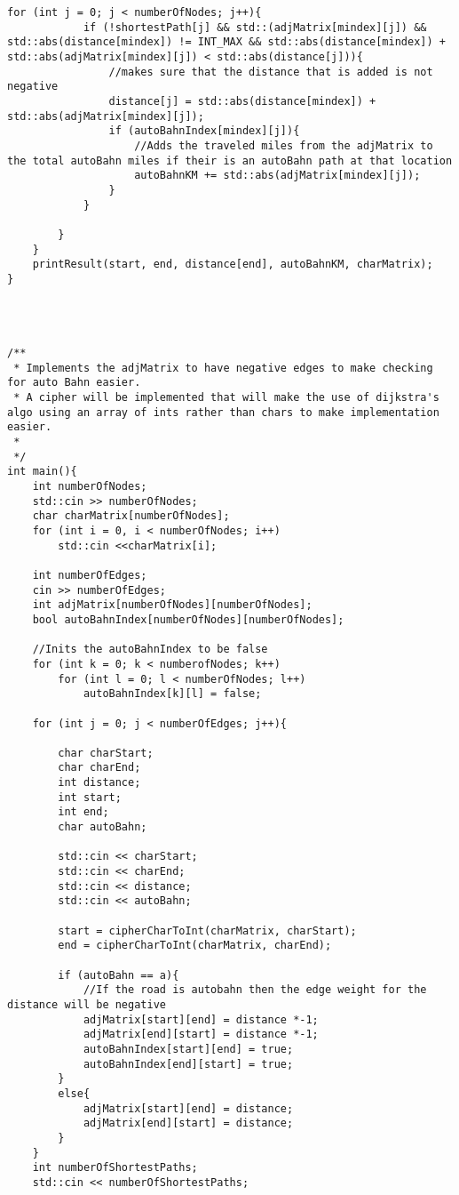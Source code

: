 \documentclass[11pt]{article}
\begin{document}
\begin {lstlisting}[frame=single]
        for (int j = 0; j < numberOfNodes; j++){
            if (!shortestPath[j] && std::(adjMatrix[mindex][j]) && std::abs(distance[mindex]) != INT_MAX && std::abs(distance[mindex]) + std::abs(adjMatrix[mindex][j]) < std::abs(distance[j])){
                //makes sure that the distance that is added is not negative 
                distance[j] = std::abs(distance[mindex]) + std::abs(adjMatrix[mindex][j]); 
                if (autoBahnIndex[mindex][j]){
                    //Adds the traveled miles from the adjMatrix to the total autoBahn miles if their is an autoBahn path at that location
                    autoBahnKM += std::abs(adjMatrix[mindex][j]);
                }
            }
            
        }
    }
    printResult(start, end, distance[end], autoBahnKM, charMatrix); 
}




/**
 * Implements the adjMatrix to have negative edges to make checking for auto Bahn easier.
 * A cipher will be implemented that will make the use of dijkstra's algo using an array of ints rather than chars to make implementation easier.
 * 
 */
int main(){
    int numberOfNodes;
    std::cin >> numberOfNodes;
    char charMatrix[numberOfNodes];
    for (int i = 0, i < numberOfNodes; i++)
        std::cin <<charMatrix[i];
    
    int numberOfEdges;
    cin >> numberOfEdges;
    int adjMatrix[numberOfNodes][numberOfNodes];
    bool autoBahnIndex[numberOfNodes][numberOfNodes];
    
    //Inits the autoBahnIndex to be false 
    for (int k = 0; k < numberofNodes; k++)
        for (int l = 0; l < numberOfNodes; l++)
            autoBahnIndex[k][l] = false;

    for (int j = 0; j < numberOfEdges; j++){

        char charStart;
        char charEnd;
        int distance;
        int start;
        int end;
        char autoBahn;

        std::cin << charStart;
        std::cin << charEnd;
        std::cin << distance;
        std::cin << autoBahn;
        
        start = cipherCharToInt(charMatrix, charStart);
        end = cipherCharToInt(charMatrix, charEnd);
               
        if (autoBahn == a){
            //If the road is autobahn then the edge weight for the distance will be negative 
            adjMatrix[start][end] = distance *-1;
            adjMatrix[end][start] = distance *-1;
            autoBahnIndex[start][end] = true;
            autoBahnIndex[end][start] = true;
        }
        else{
            adjMatrix[start][end] = distance;
            adjMatrix[end][start] = distance;
        }
    }
    int numberOfShortestPaths;
    std::cin << numberOfShortestPaths;
    

\end{lstlisting}
\end{document}
